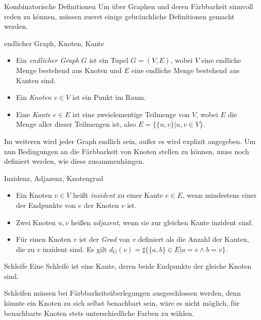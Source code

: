 \begin{section}{Kombinatorische Definitionen}
  Um über Graphen und deren Färbbarkeit sinnvoll reden zu können, müssen zuerst einige gebräuchliche Definitionen gemacht werden. 
 
  \begin{definition}{endlicher Graph, Knoten, Kante}
    \-\ 
    \begin{itemize}
    \item Ein \textit{endlicher Graph} $G$ ist ein Tupel $G=(V,E)$, wobei $V$ eine endliche Menge bestehend aus Knoten und $E$ eine endliche Menge bestehend aus Kanten sind.
    \item Ein \textit{Knoten} $v \in V$ ist ein Punkt im Raum. 
    \item Eine \textit{Kante} $e \in E$ ist eine zweielementige Teilmenge von $V$, wobei $E$ die Menge aller dieser Teilmengen ist, also $E = \{\{u,v\}|u,v \in V\}$.
    \end{itemize}
  \end{definition}
  
  Im weiteren wird jeder Graph endlich sein, außer es wird explizit angegeben. Um nun Bedingungen an die Färbbarkeit von Knoten stellen zu können, muss noch definiert werden, wie diese zusammenhängen.
  
  \begin{definition}{Inzidenz, Adjazenz, Knotengrad}
    \-\ 
    \begin{itemize}
    \item Ein Knoten $v \in V$ heißt \textit{inzident} zu einer Kante $e \in E$, wenn mindestens einer der Endpunkte von $e$ der Knoten $v$ ist. 
    \item Zwei Knoten $u,v$ heißen \textit{adjazent}, wenn sie zur gleichen Kante inzident sind. 
    \item Für einen Knoten $v$ ist der \textit{Grad} von $v$ definiert als die Anzahl der Kanten, die zu $v$ inzident sind. Es gilt $d_G(v) = \sharp\{\{a,b\} \in E | a=v \wedge b=v \}$.
   \end{itemize}
  \end{definition}
  
  \begin{definition}{Schleife}
   Eine Schleife ist eine Kante, deren beide Endpunkte der gleiche Knoten sind.
  \end{definition}
  Schleifen müssen bei Färbbarkeitsüberlegungen ausgeschlossen werden, denn könnte ein Knoten zu sich selbst benachbart sein, wäre es nicht möglich, für benachbarte Knoten stets unterschiedliche Farben zu wählen.
  

\end{section}
